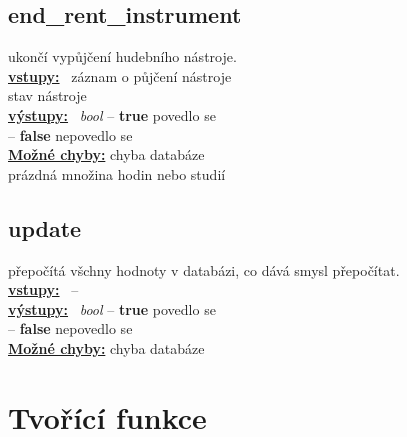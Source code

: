 \documentclass[a4paper, 11pt, twocolumn]{article}
\begin{document}
\subsection{end\_rent\_instrument}\label{endux5frentux5finstrument}
\vspace*{-0.3cm}
ukončí vypůjčení hudebního nástroje. \\
\noindent \underline{\textbf{vstupy:}} \, záznam o půjčení nástroje  \\
\noindent \hspace*{1.4cm} stav nástroje \\
\noindent \underline{\textbf{výstupy:}} \, \textit{bool} -- \textbf{true} povedlo se \\
\hspace*{2.35cm} -- \textbf{false} nepovedlo se  \\
\underline{\textbf{Možné chyby:}} chyba databáze \\
\hspace*{1.4cm} prázdná množina hodin nebo studií \\

\subsection{update}\label{update}
\vspace*{-0.3cm}
přepočítá všchny hodnoty v databázi, co dává smysl přepočítat. \\
\noindent \underline{\textbf{vstupy:}} \, --  \\
\noindent \underline{\textbf{výstupy:}} \, \textit{bool} -- \textbf{true} povedlo se \\
\hspace*{2.35cm} -- \textbf{false} nepovedlo se  \\
\underline{\textbf{Možné chyby:}} chyba databáze



\section{Tvořící funkce}\label{tvoux159uxedcuxed-funkce-funkce}
\end{document}
